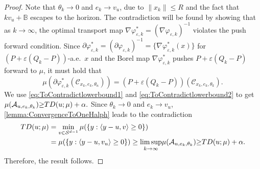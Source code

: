 \documentclass[10pt,a4paper]{amsart}
\newcommand{\eps}{\varepsilon}
\begin{document}
\begin{proof}
Note that $\theta_k\to 0  $ and $e_k\to v_u$, due to $\|x_k\|\leq R$ and the fact that $k v_u+\mathbb{B}$ escapes to the horizon.   The contradiction will be found by showing that as $k\to \infty$, the optimal transport map $\nabla \varphi_{\eps,k}^*=(\nabla \varphi_{\eps,k})^{-1}$ violates the push forward condition. 
Since  $\partial  \varphi_{\eps,k}^*= (\partial  \varphi_{\eps,k})^{-1}= \{\nabla  \varphi_{\eps,k}^*(x)\}$ for $(P+\eps (Q_{k}-P))$-a.e.\ $x$ and the Borel map $\nabla  \varphi_{\eps,k}^*$ pushes $P+\eps (Q_{k}-P)$ forward to $\mu$, it must hold that 
$$ \mu(\partial  \varphi_{\eps,k}^*(\mathcal{C}_{x_k,e_k,\theta_n}))= (P+\eps (Q_{k}-P))(\mathcal{C}_{x_k,e_k,\theta_k}).$$
We use \eqref{eq:ToContradictlowerbound1} and \eqref{eq:ToContradictlowerbound2} to get 
$ \mu(\mathcal{A}_{u,e_k,\theta_k}) {\geq } {\rm TD}(u;\mu)+\alpha.$ Since $\theta_k\to 0$ and $e_k\to v_u$, \autoref{lemma:ConvergenceToOneHalph} leads to the contradiction
\begin{align*}
      {\rm TD}(u;\mu)&=\min_{v\in \mathcal{S}^{d-1}}\mu(\{ y: 
      \langle  y-u, v\rangle\geq 
0  \} )\\
&=\mu(\{ y: 
      \langle  y-u, v_u\rangle\geq 
0  \} )
\geq  {\limsup_{k\to \infty}}\mu(\mathcal{A}_{u,e_k,\theta_k}) {\geq }{\rm TD}(u;\mu)+\alpha.
\end{align*}
Therefore, the result follows. 
\end{proof}
\end{document}
